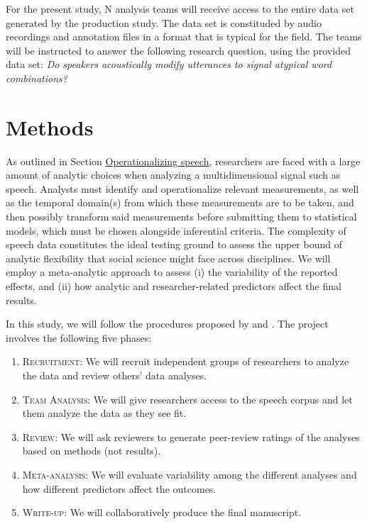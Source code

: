 \documentclass[Review,times,sageh]{sagej}
\providecommand{\tightlist}{\setlength{\itemsep}{0pt}\setlength{\parskip}{0pt}}
\begin{document}
For the present study, N analysis teams will receive access to the
entire data set generated by the production study. The data set is
constituded by audio recordings and annotation files in a format that is
typical for the field. The teams will be instructed to answer the
following research question, using the provided data set: \emph{Do
speakers acoustically modify utterances to signal atypical word
combinations?}

\section{Methods}\label{methods}

As outlined in Section \protect\hyperlink{s:operspeech}{Operationalizing
speech}, researchers are faced with a large amount of analytic choices
when analyzing a multidimensional signal such as speech. Analysts must
identify and operationalize relevant measurements, as well as the
temporal domain(s) from which these measurements are to be taken, and
then possibly transform said measurements before submitting them to
statistical models, which must be chosen alongside inferential criteria.
The complexity of speech data constitutes the ideal testing ground to
assess the upper bound of analytic flexibility that social science might
face across disciplines. We will employ a meta-analytic approach to
assess (i) the variability of the reported effects, and (ii) how
analytic and researcher-related predictors affect the final results.

In this study, we will follow the procedures proposed by
\citet{Parker2020} and \citet{aczel2021}. The project involves the
following five phases:

\begin{enumerate}
\def\labelenumi{\arabic{enumi}.}
\tightlist
\item
  \textsc{Recruitment}: We will recruit independent groups of
  researchers to analyze the data and review others' data analyses.
\item
  \textsc{Team Analysis}: We will give researchers access to the speech
  corpus and let them analyze the data as they see fit.
\item
  \textsc{Review}: We will ask reviewers to generate peer-review ratings
  of the analyses based on methods (not results).
\item
  \textsc{Meta-analysis}: We will evaluate variability among the
  different analyses and how different predictors affect the outcomes.
\item
  \textsc{Write-up}: We will collaboratively produce the final
  manuscript.
\end{enumerate}
\end{document}

